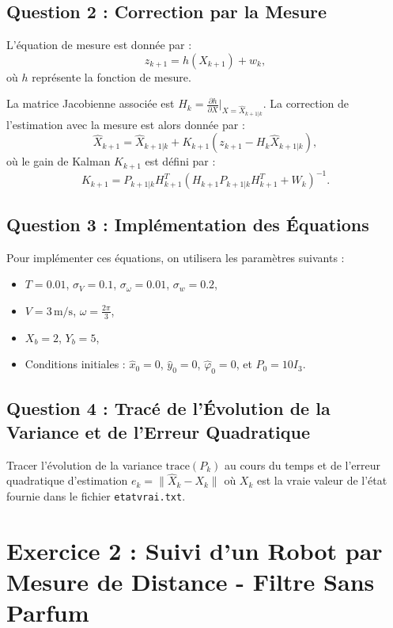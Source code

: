 \subsection{Question 2 : Correction par la Mesure}
L'équation de mesure est donnée par :
\begin{equation}
    z_{k+1} = h(X_{k+1}) + w_k,
\end{equation}
où \( h \) représente la fonction de mesure.

La matrice Jacobienne associée est \( H_k = \frac{\partial h}{\partial X} \big|_{X=\hat{X}_{k+1|k}} \). La correction de l'estimation avec la mesure est alors donnée par :
\begin{equation}
    \hat{X}_{k+1} = \hat{X}_{k+1|k} + K_{k+1} (z_{k+1} - H_k \hat{X}_{k+1|k}),
\end{equation}
où le gain de Kalman \( K_{k+1} \) est défini par :
\begin{equation}
    K_{k+1} = P_{k+1|k} H_{k+1}^T \left( H_{k+1} P_{k+1|k} H_{k+1}^T + W_k \right)^{-1}.
\end{equation}

\subsection{Question 3 : Implémentation des Équations}
Pour implémenter ces équations, on utilisera les paramètres suivants :
\begin{itemize}
    \item \( T = 0.01 \), \( \sigma_V = 0.1 \), \( \sigma_\omega = 0.01 \), \( \sigma_w = 0.2 \),
    \item \( V = 3 \, \text{m/s} \), \( \omega = \frac{2\pi}{3} \),
    \item \( X_b = 2 \), \( Y_b = 5 \),
    \item Conditions initiales : \( \hat{x}_0 = 0 \), \( \hat{y}_0 = 0 \), \( \hat{\varphi}_0 = 0 \), et \( P_0 = 10 I_3 \).
\end{itemize}

\subsection{Question 4 : Tracé de l'Évolution de la Variance et de l'Erreur Quadratique}
Tracer l'évolution de la variance \( \text{trace}(P_k) \) au cours du temps et de l'erreur quadratique d'estimation \( e_k = \|\hat{X}_k - X_k\| \) où \( X_k \) est la vraie valeur de l'état fournie dans le fichier \texttt{etatvrai.txt}.

\section{Exercice 2 : Suivi d'un Robot par Mesure de Distance - Filtre Sans Parfum}

